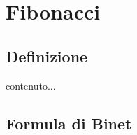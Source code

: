 \chapter{Fibonacci}
\section{Definizione}
\begin{defn}
	contenuto...
\end{defn}
\section{Formula di Binet}
